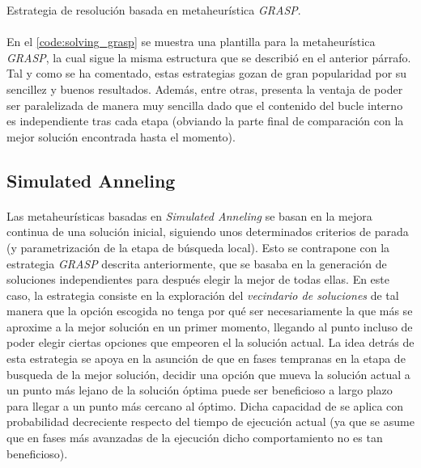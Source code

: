 \documentclass{subfiles}
\begin{document}
      \begin{algorithm}[ht]
        \SetAlgoLined
        \caption{Estrategia de resolución basada en metaheurística \emph{GRASP}.}
        \label{code:solving_grasp}
      \end{algorithm}

      \paragraph{}
      En el \cref{code:solving_grasp} se muestra una plantilla para la metaheurística \emph{GRASP}, la cual sigue la misma estructura que se describió en el anterior párrafo. Tal y como se ha comentado, estas estrategias gozan de gran popularidad por su sencillez y buenos resultados. Además, entre otras, presenta la ventaja de poder ser paralelizada de manera muy sencilla dado que el contenido del bucle interno es independiente tras cada etapa (obviando la parte final de comparación con la mejor solución encontrada hasta el momento).

      \subsection{Simulated Anneling}
      \label{sec:solving_simulated_anneling}

        \paragraph{}
        Las metaheurísticas basadas en \emph{Simulated Anneling} se basan en la mejora continua de una solución inicial, siguiendo unos determinados criterios de parada (y parametrización de la etapa de búsqueda local). Esto se contrapone con la estrategia \emph{GRASP} descrita anteriormente, que se basaba en la generación de soluciones independientes para después elegir la mejor de todas ellas. En este caso, la estrategia consiste en la exploración del \emph{vecindario de soluciones} de tal manera que la opción escogida no tenga por qué ser necesariamente la que más se aproxime a la mejor solución en un primer momento, llegando al punto incluso de poder elegir ciertas opciones que empeoren el la solución actual. La idea detrás de esta estrategia se apoya en la asunción de que en fases tempranas en la etapa de busqueda de la mejor solución, decidir una opción que mueva la solución actual a un punto más lejano de la solución óptima puede ser beneficioso a largo plazo para llegar a un punto más cercano al óptimo. Dicha capacidad de  se aplica con probabilidad decreciente respecto del tiempo de ejecución actual (ya que se asume que en fases más avanzadas de la ejecución dicho comportamiento no es tan beneficioso).
\end{document}
